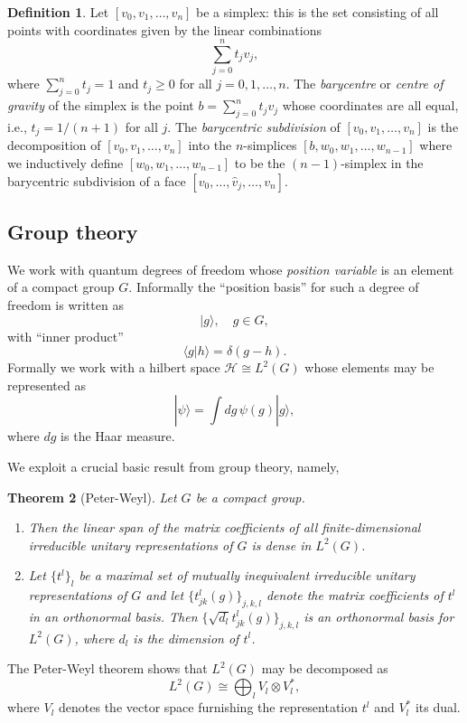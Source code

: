 \documentclass[12pt]{amsart}
\newtheorem{theorem}{Theorem}[section]
\theoremstyle{definition}
\newtheorem{definition}[theorem]{Definition}
\theoremstyle{remark}
\numberwithin{equation}{section}
\begin{document}
\begin{definition}
	Let $[v_0, v_1, \ldots, v_n]$ be a simplex: this is the set consisting of all points with coordinates given by the linear combinations
	\begin{equation}
		\sum_{j=0}^n t_j v_j, 
	\end{equation}
	where $\sum_{j=0}^n t_j = 1$ and $t_j\ge 0$ for all $j = 0, 1, \ldots, n$. The \emph{barycentre} or \emph{centre of gravity} of the simplex is the point $b = \sum_{j=0}^n t_j v_j$ whose coordinates are all equal, i.e., $t_j = 1/(n+1)$ for all $j$. The \emph{barycentric subdivision} of $[v_0, v_1, \ldots, v_n]$ is the decomposition of $[v_0, v_1, \ldots, v_n]$ into the $n$-simplices $[b, w_0, w_1, \ldots, w_{n-1}]$ where we inductively define $[w_0, w_1, \ldots, w_{n-1}]$ to be the $(n-1)$-simplex in the barycentric subdivision of a face $[v_0, \ldots, \widehat{v}_j, \ldots, v_n]$.
\end{definition}

\subsection{Group theory}
We work with quantum degrees of freedom whose \emph{position variable} is an element of a compact group $G$. Informally the ``position basis'' for such a degree of freedom is written as  
\begin{equation}
	|g\rangle, \quad g\in G,
\end{equation}
with ``inner product''
\begin{equation}
	\langle g|h\rangle = \delta(g-h).
\end{equation}
Formally we work with a hilbert space $\mathcal{H} \cong L^2(G)$ whose elements may be represented as
\begin{equation}
	|\psi\rangle = \int dg\, \psi(g)|g\rangle,
\end{equation}
where $dg$ is the Haar measure.

We exploit a crucial basic result from group theory, namely,
\begin{theorem}[Peter-Weyl]
	Let $G$ be a compact group. 
	\begin{enumerate} 
	\item Then the linear span of the matrix coefficients of all finite-dimensional irreducible unitary representations of  $G$ is dense in $L^2(G)$. 
	\item Let $\{t^l\}_l$ be a maximal set of mutually inequivalent irreducible unitary representations of $G$ and let $\{t_{jk}^l(g)\}_{j,k,l}$ denote the matrix coefficients of $t^l$ in an orthonormal basis. Then $\{\sqrt{d_l} t_{jk}^l(g)\}_{j,k,l}$ is an orthonormal basis for $L^2(G)$, where $d_l$ is the dimension of $t^l$.
	\end{enumerate}
\end{theorem}
The Peter-Weyl theorem shows that $L^2(G)$ may be decomposed as
\begin{equation}
	L^2(G) \cong \bigoplus_{l} V_l\otimes V_l^*,
\end{equation}
where $V_l$ denotes the vector space furnishing the representation $t^l$ and $V^*_l$ its dual.
\end{document}
